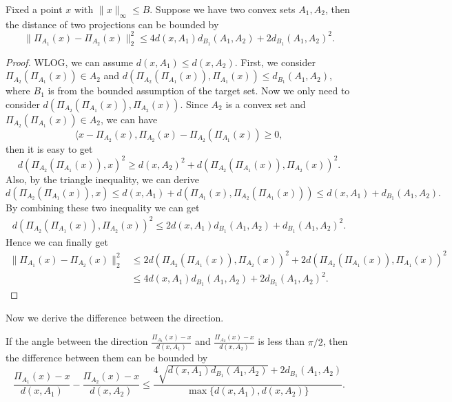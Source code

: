 \begin{lemma}\label{lemma:dis of proj}
    Fixed a point $x$ with $\|x\|_\infty \le B$. Suppose we have two convex sets $A_1,A_2$, then the distance of two projections can be bounded by 
    \begin{equation*}
        \|\Pi_{A_1}(x)-\Pi_{A_2}(x)\|_2^2 \le 4d(x, A_1)d_{B_1}(A_1,A_2)+2d_{B_1}(A_1,A_2)^2.
    \end{equation*}
\end{lemma}
 \begin{proof}
 WLOG, we can assume $d(x, A_1)\le d(x, A_2).$
     First, we consider $\Pi_{A_2}(\Pi_{A_1}(x)) \in A_2$ and $d(\Pi_{A_2}(\Pi_{A_1}(x)), \Pi_{A_1}(x)) \le d_{B_1}(A_1,A_2)$, where $B_1$ is from the bounded assumption of the target set.
     Now we only need to consider $d(\Pi_{A_2}(\Pi_{A_1}(x)), \Pi_{A_2}(x))$.
     Since $A_2$ is a convex set and $\Pi_{A_2}(\Pi_{A_1}(x)) \in A_2$, we can have 
     $$\langle x - \Pi_{A_2}(x), \Pi_{A_2}(x) - \Pi_{A_2}(\Pi_{A_1}(x))\ge 0,$$ then it is easy to get
     \begin{equation*}
         d(\Pi_{A_2}(\Pi_{A_1}(x)),x)^2 \ge d(x, A_2)^2 + d(\Pi_{A_2}(\Pi_{A_1}(x)), \Pi_{A_2}(x))^2.
     \end{equation*}
     Also, by the triangle inequality, we can derive 
     \begin{equation*}
         d(\Pi_{A_2}(\Pi_{A_1}(x)),x) \le d(x, A_1) + d(\Pi_{A_1}(x), \Pi_{A_2}(\Pi_{A_1}(x)))\le d(x, A_1) + d_{B_1}(A_1,A_2).
    \end{equation*}
    By combining these two inequality we can get 
    \begin{align*}
        d(\Pi_{A_2}(\Pi_{A_1}(x)), \Pi_{A_2}(x))^2 \le 2d(x, A_1)d_{B_1}(A_1,A_2) + d_{B_1}(A_1,A_2)^2.
    \end{align*}
     Hence we can finally get 
     \begin{align*}
         \|\Pi_{A_1}(x)- \Pi_{A_2}(x)\|_2^2 &\le 2d(\Pi_{A_2}(\Pi_{A_1}(x)), \Pi_{A_2}(x))^2 + 2d(\Pi_{A_2}(\Pi_{A_1}(x)), \Pi_{A_1}(x))^2 \\
         &\le 4d(x, A_1)d_{B_1}(A_1,A_2)+2d_{B_1}(A_1,A_2)^2.
     \end{align*}
 \end{proof}
Now we derive the difference between the direction. 
\begin{lemma}\label{lemma:direc}
    If the angle between the direction $ \frac{\Pi_{A_1}(x)-x}{d(x, A_1)}$ and $\frac{\Pi_{A_2}(x)-x}{d(x, A_2)}$ is less than $\pi/2$, then the  difference between them can be bounded by 
    $$\frac{\Pi_{A_1}(x)-x}{d(x, A_1)} - \frac{\Pi_{A_2}(x)-x}{d(x, A_2)}\le\frac{4\sqrt{d(x, A_1)d_{B_1}(A_1,A_2)}+2d_{B_1}(A_1,A_2)}{\max\{d(x, A_1), d(x, A_2)\}}. $$
\end{lemma}
